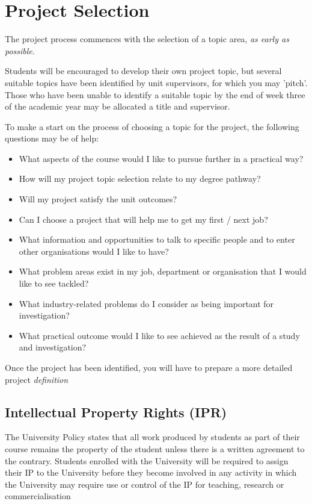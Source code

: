 \chapter{Project Selection}

The project process commences with the selection of a topic area, \textit{as early as possible}.

\begin{tcolorbox}
    Students will be encouraged to develop their own project topic, but several suitable topics have been identified by unit supervisors, for which you may 'pitch’. Those who have been unable to identify a suitable topic by the end of week three of the academic year may be allocated a title and supervisor.
\end{tcolorbox}
    
To make a start on the process of choosing a topic for the project, the following questions may be of
help:

\begin{itemize}
    \item What aspects of the course would I like to pursue further in a practical way?
    \item How will my project topic selection relate to my degree pathway?
    \item Will my project satisfy the unit outcomes?
    \item Can I choose a project that will help me to get my first / next job?
    \item What information and opportunities to talk to specific people and to enter other organisations would I like to have?
    \item What problem areas exist in my job, department or organisation that I would like to see tackled?
    \item What industry-related problems do I consider as being important for investigation?
    \item What practical outcome would I like to see achieved as the result of a study and investigation?
\end{itemize}

Once the project has been identified, you will have to prepare a more detailed project \textit{definition}

\section{Intellectual Property Rights (IPR)}

The University Policy states that all work produced by students as part of their course remains the property of the student unless there is a written agreement to the contrary. Students enrolled with the University will be required to assign their IP to the University before they become involved in any activity in which the University may require use or control of the IP for teaching, research or commercialisation

